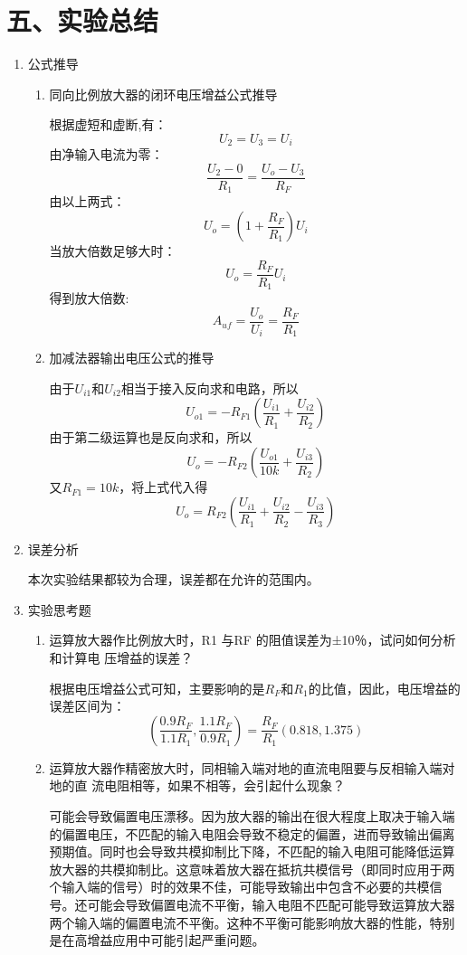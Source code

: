 \documentclass[a4paper,10pt,notitlepage]{article}
\begin{document}
	\section*{五、实验总结}
	\begin{enumerate}
		\item 公式推导
		\begin{enumerate}
			\item 同向比例放大器的闭环电压增益公式推导\par 
			根据虚短和虚断,有：
			$$U_2=U_3=U_i$$
			由净输入电流为零：
			$$\frac{U_2-0}{R_1}=\frac{U_o-U_3}{R_{F}}$$
			由以上两式：
			$$U_o=(1+\frac{R_F}{R_1})U_i$$
			当放大倍数足够大时：
			$$U_o=\frac{R_F}{R_1}U_i$$
			得到放大倍数:
			$$A_{uf}=\frac{U_o}{U_i}=\frac{R_F}{R_1}$$
			\item 加减法器输出电压公式的推导\par 
			由于$U_{i1}$和$U_{i2}$相当于接入反向求和电路，所以
			$$U_{o1}=-R_{F1}(\frac{U_{i1}}{R_1}+\frac{U_{i2}}{R_2})$$
			由于第二级运算也是反向求和，所以
			$$U_{o}=-R_{F2}(\frac{U_{o1}}{10k}+\frac{U_{i3}}{R_2})$$
			又$R_{F1}=10k$，将上式代入得
			$$U_o=R_{F2}(\frac{U_{i1}}{R_1}+\frac{U_{i2}}{R_2}-\frac{U_{i3}}{R_3})$$
		\end{enumerate}
		\item 误差分析\par 
		\qquad 本次实验结果都较为合理，误差都在允许的范围内。
		\item 实验思考题
		\begin{enumerate}
			\item 运算放大器作比例放大时，R1 与RF 的阻值误差为±10％，试问如何分析和计算电
			压增益的误差？\par
			\qquad 根据电压增益公式可知，主要影响的是$R_F$和$R_1$的比值，因此，电压增益的误差区间为：
			$$(\frac{0.9R_F}{1.1R_1},\frac{1.1R_F}{0.9R_1})
			=\frac{R_F}{R_1}(0.818,1.375)$$
			\item 运算放大器作精密放大时，同相输入端对地的直流电阻要与反相输入端对地的直
			流电阻相等，如果不相等，会引起什么现象？\par 
			\qquad 可能会导致偏置电压漂移。因为放大器的输出在很大程度上取决于输入端的偏置电压，不匹配的输入电阻会导致不稳定的偏置，进而导致输出偏离预期值。同时也会导致共模抑制比下降，不匹配的输入电阻可能降低运算放大器的共模抑制比。这意味着放大器在抵抗共模信号（即同时应用于两个输入端的信号）时的效果不佳，可能导致输出中包含不必要的共模信号。还可能会导致偏置电流不平衡，输入电阻不匹配可能导致运算放大器两个输入端的偏置电流不平衡。这种不平衡可能影响放大器的性能，特别是在高增益应用中可能引起严重问题。
		\end{enumerate}
	\end{enumerate}
\end{document}
